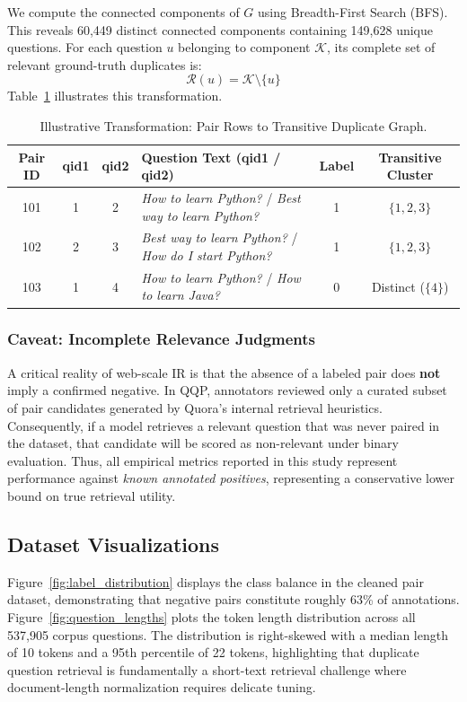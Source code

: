 \documentclass[11pt,a4paper]{article}
\begin{document}
We compute the connected components of $G$ using Breadth-First Search (BFS). This reveals 60,449 distinct connected components containing 149,628 unique questions. For each question $u$ belonging to component $\mathcal{K}$, its complete set of relevant ground-truth duplicates is:
\begin{equation}
\label{eq:duplicate_closure}
\mathcal{R}(u) = \mathcal{K} \setminus \{u\}
\end{equation}
Table~\ref{tab:illustrative_pairs} illustrates this transformation.

\begin{table}[h]
\centering
\small
\caption{Illustrative Transformation: Pair Rows to Transitive Duplicate Graph.}
\label{tab:illustrative_pairs}
\begin{tabularx}{\textwidth}{cccXcc}
\toprule
\textbf{Pair ID} & \textbf{qid1} & \textbf{qid2} & \textbf{Question Text (qid1 / qid2)} & \textbf{Label} & \textbf{Transitive Cluster} \\
\midrule
101 & 1 & 2 & \textit{How to learn Python?} / \textit{Best way to learn Python?} & 1 & $\{1, 2, 3\}$ \\
102 & 2 & 3 & \textit{Best way to learn Python?} / \textit{How do I start Python?} & 1 & $\{1, 2, 3\}$ \\
103 & 1 & 4 & \textit{How to learn Python?} / \textit{How to learn Java?} & 0 & Distinct ($\{4\}$) \\
\bottomrule
\end{tabularx}
\end{table}

\subsubsection{Caveat: Incomplete Relevance Judgments}
A critical reality of web-scale IR is that the absence of a labeled pair does \textbf{not} imply a confirmed negative. In QQP, annotators reviewed only a curated subset of pair candidates generated by Quora's internal retrieval heuristics. Consequently, if a model retrieves a relevant question that was never paired in the dataset, that candidate will be scored as non-relevant under binary evaluation. Thus, all empirical metrics reported in this study represent performance against \textit{known annotated positives}, representing a conservative lower bound on true retrieval utility.

\subsection{Dataset Visualizations}
Figure~\ref{fig:label_distribution} displays the class balance in the cleaned pair dataset, demonstrating that negative pairs constitute roughly 63\% of annotations. Figure~\ref{fig:question_lengths} plots the token length distribution across all 537,905 corpus questions. The distribution is right-skewed with a median length of 10 tokens and a 95th percentile of 22 tokens, highlighting that duplicate question retrieval is fundamentally a short-text retrieval challenge where document-length normalization requires delicate tuning.
\end{document}
